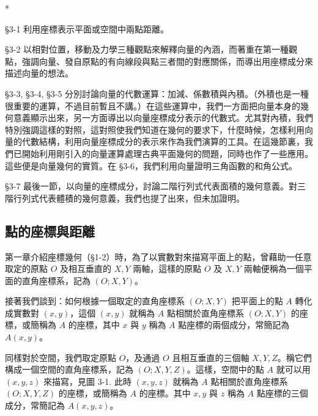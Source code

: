\begin{center}
* \qquad\qquad * \qquad\qquad * \qquad\qquad * \qquad\qquad *
\end{center}

§3-1 利用座標表示平面或空間中兩點距離。

§3-2 以相對位置，移動及力學三種觀點來解釋向量的內涵，而著重在第一種觀點，強調向量、發自原點的有向線段與點三者間的對應關係，而導出用座標成分來描述向量的想法。

§3-3, §3-4, §3-5 分別討論向量的代數運算：加減、係數積與內積。（外積也是一種很重要的運算，不過目前暫且不講。）在這些運算中，我們一方面把向量本身的幾何意義顯示出來，另一方面導出以向量座標成分表示的代數式。尤其對內積，我們特別強調這樣的對照，這對照使我們知道在幾何的要求下，什麼時候，怎樣利用向量的代數結構，利用向量座標成分的表示來作為我們演算的工具。在這幾節裏，我們已開始利用剛引入的向量運算處理古典平面幾何的問題，同時也作了一些應用。這些便是向量幾何的實質。在 §3-6，我們利用向量證明三角函數的和角公式。

§3-7 最後一節，以向量的座標成分，討論二階行列式代表面積的幾何意義。對三階行列式代表體積的幾何意義，我們也提了出來，但未加證明。

\subsection{點的座標與距離}
\label{sec:b3s-3-1}

第一章介紹座標幾何（§1-2）時，為了以實數對來描寫平面上的點，曾藉助一任意取定的原點 $O$ 及相互垂直的 $X, Y$ 兩軸，這樣的原點 $O$ 及 $X, Y$ 兩軸便稱為一個平面的直角座標系，記為 $(O; X, Y)$。

接著我們談到：如何根據一個取定的直角座標系 $(O; X, Y)$ 把平面上的點 $A$ 轉化成實數對 $(x, y)$，這個 $(x, y)$ 就稱為 $A$ 點相關於直角座標系 $(O; X, Y)$ 的座標，或簡稱為 $A$ 的座標，其中 $x$ 與 $y$ 稱為 $A$ 點座標的兩個成分，常簡記為 $A(x, y)$。

同樣對於空間，我們取定原點 $O$，及通過 $O$ 且相互垂直的三個軸 $X, Y, Z$。稱它們構成一個空間的直角座標系，記為 $(O; X, Y, Z)$。這樣，空間中的點 $A$ 就可以用 $(x, y, z)$ 來描寫，見圖 3-1. 此時 $(x, y, z)$ 就稱為 $A$ 點相關於直角座標系 $(O; X, Y, Z)$ 的座標，或簡稱為 $A$ 的座標。其中 $x, y$ 與 $z$ 稱為 $A$ 點座標的三個成分，常簡記為 $A(x, y, z)$。

